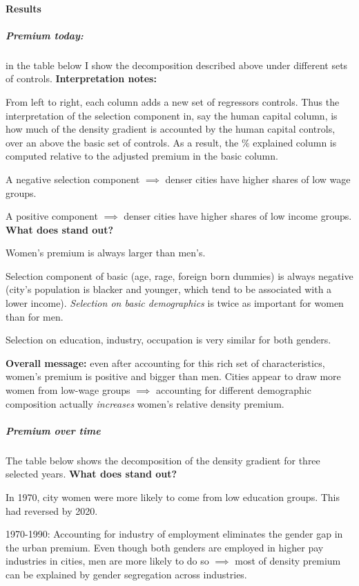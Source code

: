 \paragraph{Results}
\subparagraph{Premium today:} in the table below I show the decomposition described above under different sets of controls.\newline
\textbf{Interpretation notes:}
\bitem
	\item From left to right, each column adds a new set of regressors controls. Thus the interpretation of the selection component in, say the human capital column, is how much of the density gradient is accounted by the human capital controls, over an above the basic set of controls. As a result, the $\%$ explained column is computed relative to the adjusted premium in the basic column.
	\item A negative selection component $\implies$ denser cities have higher shares of low wage groups.
	\item A positive component $\implies$ denser cities have higher shares of low income groups.
\eitem
\textbf{What does stand out?}
\bitem
	\item Women's premium is always larger than men's.
	\item Selection component of basic (age, rage, foreign born dummies) is always negative (city's population is blacker and younger, which tend to be associated with a lower income). \textit{Selection on basic demographics} is twice as important for women than for men.
	\item Selection on education, industry, occupation is very similar for both genders.
	\item \textbf{Overall message:} even after accounting for this rich set of characteristics, women's premium is positive and bigger than men. Cities appear to draw more women from low-wage groups $\implies$ accounting for different demographic composition actually \textit{increases} women's relative density premium.
\eitem
\subparagraph{Premium over time}
The table below shows the decomposition of the density gradient for three selected years. \newline
\textbf{What does stand out?}
\bitem 
	\item In 1970, city women were more likely to come from low education groups. This had reversed by 2020.
	\item 1970-1990: Accounting for industry of employment eliminates the gender gap in the urban premium. Even though both genders are employed in higher pay industries in cities, men are more likely to do so $\implies$ most of density premium can be explained by gender segregation across industries.
